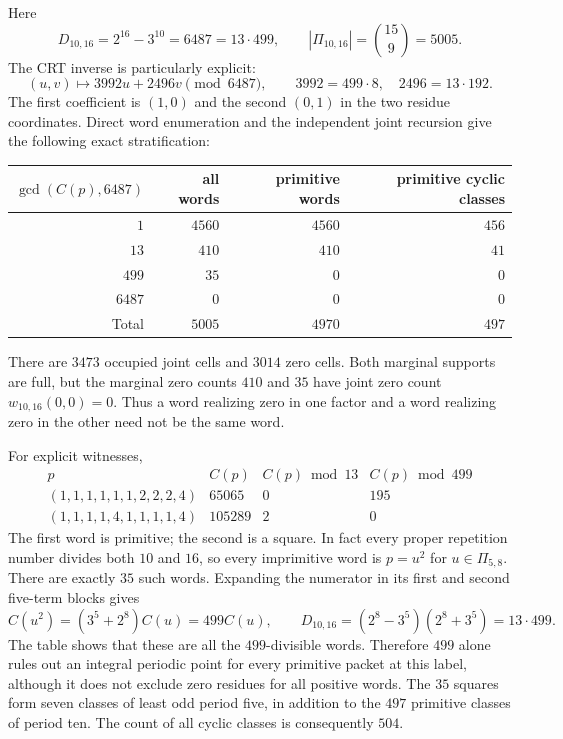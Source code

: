 Here
\[
 D_{10,16}=2^{16}-3^{10}=6487=13\cdot499,\qquad
 |\Pi_{10,16}|=\binom{15}{9}=5005.
\]
The CRT inverse is particularly explicit:
\[
 (u,v)\longmapsto3992u+2496v\pmod{6487},
 \qquad3992=499\cdot8,\quad2496=13\cdot192.
\]
The first coefficient is $(1,0)$ and the second $(0,1)$ in the two residue
coordinates.  Direct word enumeration and the independent joint recursion
give the following exact stratification:
\begin{center}
\begin{tabular}{r r r r}
\toprule
$\gcd(C(p),6487)$ & all words & primitive words & primitive cyclic classes\\
\midrule
$1$    & $4560$ & $4560$ & $456$\\
$13$   & $410$  & $410$  & $41$\\
$499$  & $35$   & $0$    & $0$\\
$6487$ & $0$    & $0$    & $0$\\
\midrule
Total  & $5005$ & $4970$ & $497$\\
\bottomrule
\end{tabular}
\end{center}
There are $3473$ occupied joint cells and $3014$ zero cells.  Both marginal
supports are full, but the marginal zero counts $410$ and $35$ have joint
zero count $w_{10,16}(0,0)=0$.  Thus a word realizing zero in one factor and
a word realizing zero in the other need not be the same word.

For explicit witnesses,
\[
 \begin{array}{c|r|r|r}
 p&C(p)&C(p)\bmod13&C(p)\bmod499\\\hline
 (1,1,1,1,1,1,2,2,2,4)&65065&0&195\\
 (1,1,1,1,4,1,1,1,1,4)&105289&2&0
 \end{array}
\]
The first word is primitive; the second is a square.  In fact every proper
repetition number divides both $10$ and $16$, so every imprimitive word is
$p=u^2$ for $u\in\Pi_{5,8}$.  There are exactly $35$ such words.  Expanding
the numerator in its first and second five-term blocks gives
\[
 C(u^2)=(3^5+2^8)C(u)=499C(u),\qquad
 D_{10,16}=(2^8-3^5)(2^8+3^5)=13\cdot499.
\]
The table shows that these are all the $499$-divisible words.  Therefore
$499$ alone rules out an integral periodic point for every primitive packet
at this label, although it does not exclude zero residues for all positive
words.  The $35$ squares form seven classes
of least odd period five, in addition to the $497$ primitive classes of
period ten.  The count of all cyclic classes is consequently $504$.

